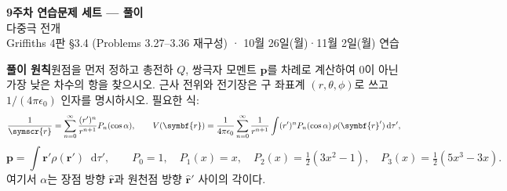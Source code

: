 \documentclass[10pt,a4paper]{article}
\newcommand{\vect}[1]{\symbf{#1}}
\newcommand{\unit}[1]{\hat{\symbf{#1}}}
\newcommand{\dd}{\mathop{}\!\mathrm{d}}
\newcommand{\sepR}{\symscr{r}}
\begin{document}
\begin{center}
  {\LARGE\bfseries\color{navy}9주차 연습문제 세트 — 풀이}\\[1.5mm]
  {\large 다중극 전개}\\[1mm]
  {\small Griffiths 4판 §3.4 (Problems 3.27--3.36 재구성) · 10월 26일(월)·11월 2일(월) 연습}
\end{center}
\begin{infobox}
\textbf{풀이 원칙}\quad 원점을 먼저 정하고 총전하 $Q$, 쌍극자 모멘트 $\vect p$를 차례로 계산하여 0이 아닌 가장 낮은 차수의 항을 찾으시오. 근사 전위와 전기장은 구 좌표계 $(r,\theta,\phi)$로 쓰고 $1/(4\pi\epsilon_0)$ 인자를 명시하시오. 필요한 식:
\[
\frac{1}{\sepR}=\sum_{n=0}^{\infty}\frac{(r')^n}{r^{n+1}}P_n(\cos\alpha),\qquad
V(\vect r)=\frac{1}{4\pi\epsilon_0}\sum_{n=0}^{\infty}\frac{1}{r^{n+1}}\int (r')^nP_n(\cos\alpha)\,\rho(\vect r')\dd\tau',
\]
\[
\vect p=\int \vect r'\rho(\vect r')\dd\tau',\qquad
P_0=1,\quad P_1(x)=x,\quad P_2(x)=\tfrac12(3x^2-1),\quad P_3(x)=\tfrac12(5x^3-3x).
\]
여기서 $\alpha$는 장점 방향 $\unit r$과 원천점 방향 $\unit r'$ 사이의 각이다.
\end{infobox}
\end{document}
